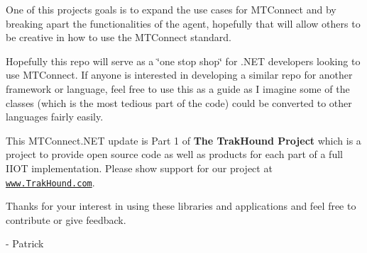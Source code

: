 One of this project\textquotesingle{}s goals is to expand the use cases for M\+T\+Connect and by breaking apart the functionalities of the agent, hopefully that will allow others to be creative in how to use the M\+T\+Connect standard.

Hopefully this repo will serve as a \char`\"{}one stop shop\char`\"{} for .N\+ET developers looking to use M\+T\+Connect. If anyone is interested in developing a similar repo for another framework or language, feel free to use this as a guide as I imagine some of the classes (which is the most tedious part of the code) could be converted to other languages fairly easily.

This M\+T\+Connect.\+N\+ET update is Part 1 of {\bfseries The Trak\+Hound Project} which is a project to provide open source code as well as products for each part of a full I\+I\+OT implementation. Please show support for our project at \href{http://www.trakhound.com}{\tt www.\+Trak\+Hound.\+com}.

Thanks for your interest in using these libraries and applications and feel free to contribute or give feedback.

-\/ Patrick 